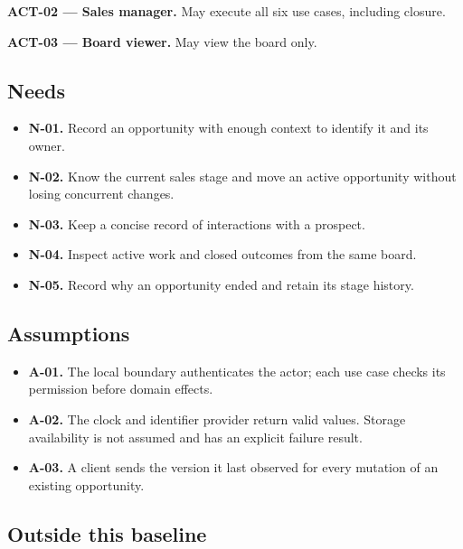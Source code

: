 \documentclass[10pt,a4paper]{article}
\begin{document}
\textbf{ACT-02 --- Sales manager.} May execute all six use cases, including closure.

\textbf{ACT-03 --- Board viewer.} May view the board only.

\subsection{Needs}

\begin{itemize}

\item \textbf{N-01.} Record an opportunity with enough context to identify it and its owner.

\item \textbf{N-02.} Know the current sales stage and move an active opportunity without losing concurrent changes.

\item \textbf{N-03.} Keep a concise record of interactions with a prospect.

\item \textbf{N-04.} Inspect active work and closed outcomes from the same board.

\item \textbf{N-05.} Record why an opportunity ended and retain its stage history.

\end{itemize}

\subsection{Assumptions}

\begin{itemize}

\item \textbf{A-01.} The local boundary authenticates the actor; each use case checks its permission before domain effects.

\item \textbf{A-02.} The clock and identifier provider return valid values. Storage availability is not assumed and has an explicit failure result.

\item \textbf{A-03.} A client sends the version it last observed for every mutation of an existing opportunity.

\end{itemize}

\subsection{Outside this baseline}
\end{document}
